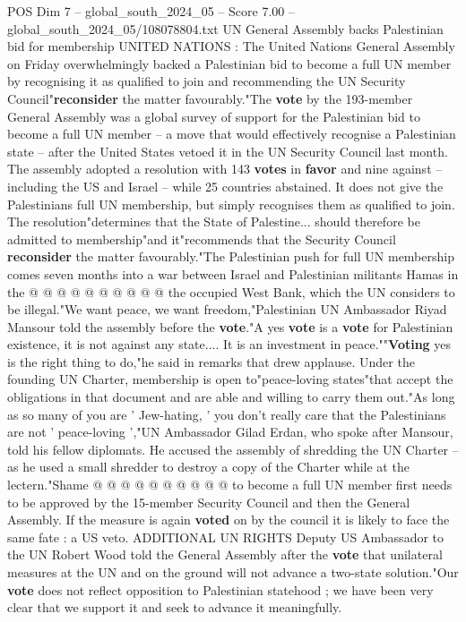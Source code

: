 \begin{textsample}{POS Dim 7 – global\_south\_2024\_05 – Score 7.00 – global\_south\_2024\_05/108078804.txt}  \label{ex:f7_pos_210}
UN General Assembly backs Palestinian bid for membership UNITED NATIONS : The United Nations General Assembly on Friday overwhelmingly backed a Palestinian bid to become a full UN member by recognising it as qualified to join and recommending the UN Security Council"\textbf{reconsider} the matter favourably."The \textbf{vote} by the 193-member General Assembly was a global survey of support for the Palestinian bid to become a full UN member -- a move that would effectively recognise a Palestinian state -- after the United States vetoed it in the UN Security Council last month.
The assembly adopted a resolution with 143 \textbf{votes} in \textbf{favor} and nine against -- including the US and Israel -- while 25 countries abstained.
It does not give the Palestinians full UN membership, but simply recognises them as qualified to join.
The resolution"determines that the State of Palestine... should therefore be admitted to membership"and it"recommends that the Security Council \textbf{reconsider} the matter favourably."The Palestinian push for full UN membership comes seven months into a war between Israel and Palestinian militants Hamas in the @ @ @ @ @ @ @ @ @ @ the occupied West Bank, which the UN considers to be illegal."We want peace, we want freedom,"Palestinian UN Ambassador Riyad Mansour told the assembly before the \textbf{vote}."A yes \textbf{vote} is a \textbf{vote} for Palestinian existence, it is not against any state....
It is an investment in peace.""\textbf{Voting} yes is the right thing to do,"he said in remarks that drew applause.
Under the founding UN Charter, membership is open to"peace-loving states"that accept the obligations in that document and are able and willing to carry them out."As long as so many of you are ' Jew-hating, ' you don't really care that the Palestinians are not ' peace-loving ',"UN Ambassador Gilad Erdan, who spoke after Mansour, told his fellow diplomats.
He accused the assembly of shredding the UN Charter -- as he used a small shredder to destroy a copy of the Charter while at the lectern."Shame @ @ @ @ @ @ @ @ @ @ to become a full UN member first needs to be approved by the 15-member Security Council and then the General Assembly.
If the measure is again \textbf{voted} on by the council it is likely to face the same fate : a US veto.
ADDITIONAL UN RIGHTS Deputy US Ambassador to the UN Robert Wood told the General Assembly after the \textbf{vote} that unilateral measures at the UN and on the ground will not advance a two-state solution."Our \textbf{vote} does not reflect opposition to Palestinian statehood ; we have been very clear that we support it and seek to advance it meaningfully.

\end{textsample}
